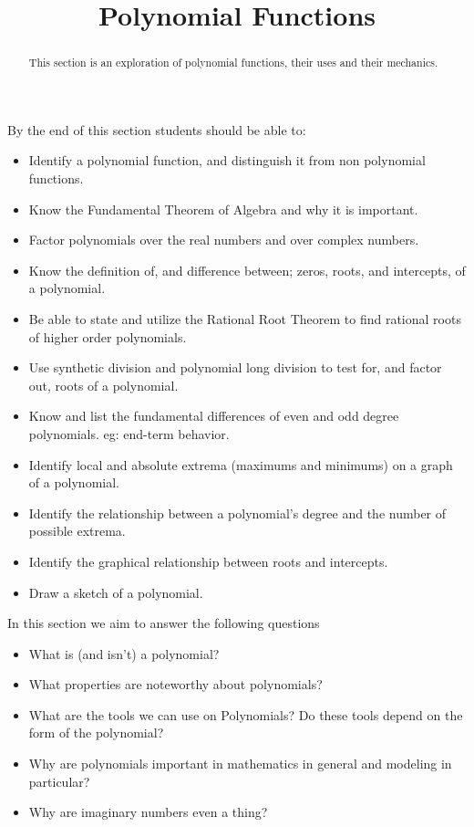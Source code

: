 \documentclass{ximera}
\title{Polynomial Functions}
\begin{document}
\begin{abstract}
    This section is an exploration of polynomial functions, their uses and their mechanics.
\end{abstract}
\maketitle
By the end of this section students should be able to:

\begin{itemize}
    \item Identify a polynomial function, and distinguish it from non polynomial functions.
    \item Know the Fundamental Theorem of Algebra and why it is important.
    \item Factor polynomials over the real numbers and over complex numbers.
    \item Know the definition of, and difference between; zeros, roots, and intercepts, of a polynomial.
    \item Be able to state and utilize the Rational Root Theorem to find rational roots of higher order polynomials.
    \item Use synthetic division and polynomial long division to test for, and factor out, roots of a polynomial.
    \item Know and list the fundamental differences of even and odd degree polynomials. eg: end-term behavior.
    \item Identify local and absolute extrema (maximums and minimums) on a graph of a polynomial.
    \item Identify the relationship between a polynomial's degree and the number of possible extrema.
    \item Identify the graphical relationship between roots and intercepts.
    \item Draw a sketch of a polynomial.
\end{itemize}


In this section we aim to answer the following questions

\begin{itemize}
    \item What is (and isn't) a polynomial?
    \item What properties are noteworthy about polynomials?
    \item What are the tools we can use on Polynomials? Do these tools depend on the form of the polynomial?
    \item Why are polynomials important in mathematics in general and modeling in particular?
    \item Why are imaginary numbers even a thing?
\end{itemize}
\end{document}
